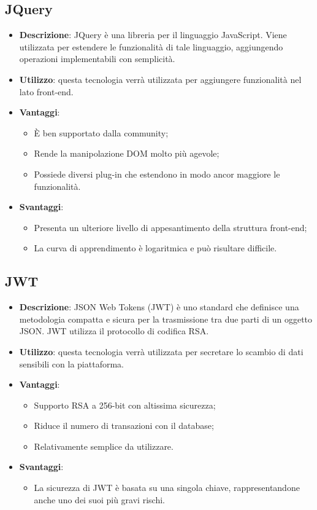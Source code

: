 \subsection{JQuery}
\begin{itemize}
	\item \textbf{Descrizione}: JQuery è una libreria per il linguaggio JavaScript. Viene utilizzata per estendere le funzionalità di tale linguaggio, aggiungendo operazioni implementabili con semplicità.
	\item \textbf{Utilizzo}: questa tecnologia verrà utilizzata per aggiungere funzionalità nel lato front-end.
	\item \textbf{Vantaggi}:
	\begin{itemize}
		\item \MakeUppercase{è} ben supportato dalla community;
		\item Rende la manipolazione DOM molto più agevole;
		\item Possiede diversi plug-in che estendono in modo ancor maggiore le funzionalità.
	\end{itemize}
	\item \textbf{Svantaggi}:
	\begin{itemize}
		\item Presenta un ulteriore livello di appesantimento della struttura front-end;
		\item La curva di apprendimento è logaritmica e può risultare difficile.
	\end{itemize}
\end{itemize}

\subsection{JWT}
\begin{itemize}
	\item \textbf{Descrizione}: JSON Web Tokens (JWT) è uno standard che definisce una metodologia compatta e sicura per la trasmissione tra due parti di un oggetto JSON. JWT utilizza il protocollo di codifica RSA.
	\item \textbf{Utilizzo}: questa tecnologia verrà utilizzata per secretare lo scambio di dati sensibili con la piattaforma.
	\item \textbf{Vantaggi}:
	\begin{itemize}
		\item Supporto RSA a 256-bit con altissima sicurezza;
		\item Riduce il numero di transazioni con il database;
		\item Relativamente semplice da utilizzare.
	\end{itemize}
	\item \textbf{Svantaggi}:
	\begin{itemize}
		\item La sicurezza di JWT è basata su una singola chiave, rappresentandone anche uno dei suoi più gravi rischi.
	\end{itemize}
\end{itemize}

